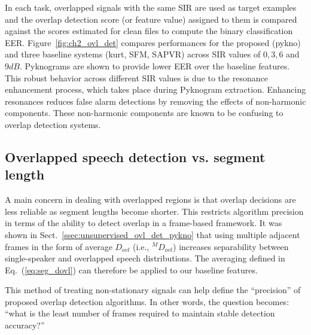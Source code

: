 {In each task, overlapped signals with the same SIR are used as target examples and the overlap detection score (or feature value) assigned to them is compared against the scores estimated for clean files to compute the binary classification EER. 
Figure~\ref{fig:ch2_ovl_det} compares performances for the proposed (pykno) and three baseline systems (kurt, SFM, SAPVR) across SIR values of $0, 3, 6$ and $9dB$. 
Pyknograms are shown to provide lower EER over the baseline features. 
This robust behavior across different SIR values is due to the resonance enhancement process, which takes place during Pyknogram extraction. 
Enhancing resonances reduces false alarm detections by removing the effects of non-harmonic components. 
These non-harmonic components are known to be confusing to overlap detection systems. 




\subsection{Overlapped speech detection vs. segment length}
\label{sssec:ovl_frame_vs_seg}

A main concern in dealing with overlapped regions is that overlap decisions are less reliable as segment lengths become shorter. 
This restricts algorithm precision in terms of the ability to detect overlap in a frame-based framework. 
It was shown in Sect.~\ref{ssec:unsupervised_ovl_det_pykno} that using multiple adjacent frames in the form of average $D_{ovl}$ (i.e., $^MD_{ovl}$) increases separability between single-speaker and overlapped speech distributions. 
The averaging defined in Eq.~(\ref{eq:seg_dovl}) can therefore be applied to our baseline features. 

This method of treating non-stationary signals can help define the ``precision'' of proposed overlap detection algorithms. 
In other words, the question becomes: ``what is the least number of frames required to maintain stable detection accuracy?'' 

}
